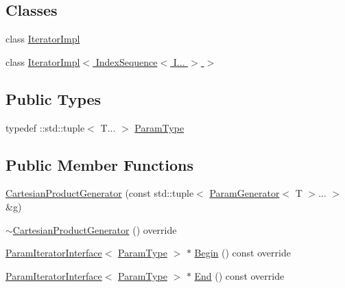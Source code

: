 \subsection*{Classes}
\begin{DoxyCompactItemize}
\item 
class \hyperlink{classtesting_1_1internal_1_1CartesianProductGenerator_1_1IteratorImpl}{Iterator\+Impl}
\item 
class \hyperlink{classtesting_1_1internal_1_1CartesianProductGenerator_1_1IteratorImpl_3_01IndexSequence_3_01I_8_8_8_01_4_01_4}{Iterator\+Impl$<$ Index\+Sequence$<$ I... $>$ $>$}
\end{DoxyCompactItemize}
\subsection*{Public Types}
\begin{DoxyCompactItemize}
\item 
typedef \+::std\+::tuple$<$ T... $>$ \hyperlink{classtesting_1_1internal_1_1CartesianProductGenerator_af27131157a9347f0c82420ca081ee7dd}{Param\+Type}
\end{DoxyCompactItemize}
\subsection*{Public Member Functions}
\begin{DoxyCompactItemize}
\item 
\hyperlink{classtesting_1_1internal_1_1CartesianProductGenerator_af89630ce27d49f999f323e6c3d2867af}{Cartesian\+Product\+Generator} (const std\+::tuple$<$ \hyperlink{classtesting_1_1internal_1_1ParamGenerator}{Param\+Generator}$<$ T $>$... $>$ \&g)
\item 
\hyperlink{classtesting_1_1internal_1_1CartesianProductGenerator_a19fb6a9435f038520cef7643fdf6da71}{$\sim$\+Cartesian\+Product\+Generator} () override
\item 
\hyperlink{classtesting_1_1internal_1_1ParamIteratorInterface}{Param\+Iterator\+Interface}$<$ \hyperlink{classtesting_1_1internal_1_1CartesianProductGenerator_af27131157a9347f0c82420ca081ee7dd}{Param\+Type} $>$ $\ast$ \hyperlink{classtesting_1_1internal_1_1CartesianProductGenerator_ad2f1bc6289b6dd7e4b5f4fecbfdf2883}{Begin} () const override
\item 
\hyperlink{classtesting_1_1internal_1_1ParamIteratorInterface}{Param\+Iterator\+Interface}$<$ \hyperlink{classtesting_1_1internal_1_1CartesianProductGenerator_af27131157a9347f0c82420ca081ee7dd}{Param\+Type} $>$ $\ast$ \hyperlink{classtesting_1_1internal_1_1CartesianProductGenerator_ae072dcf8400ac9dd5692e417262a664b}{End} () const override
\end{DoxyCompactItemize}
